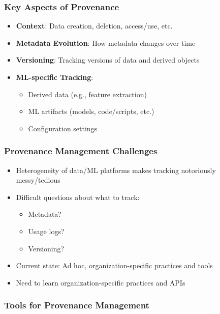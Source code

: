 \documentclass[12pt]{article}
\begin{document}
\subsubsection{Key Aspects of Provenance}
\begin{itemize}
    \item \textbf{Context}: Data creation, deletion, access/use, etc.
    \item \textbf{Metadata Evolution}: How metadata changes over time
    \item \textbf{Versioning}: Tracking versions of data and derived objects
    \item \textbf{ML-specific Tracking}: 
    \begin{itemize}
        \item Derived data (e.g., feature extraction)
        \item ML artifacts (models, code/scripts, etc.)
        \item Configuration settings
    \end{itemize}
\end{itemize}

\subsubsection{Provenance Management Challenges}
\begin{tcolorbox}[colback=red!5!white,colframe=red!75!black,title={Challenges}]
\begin{itemize}
    \item Heterogeneity of data/ML platforms makes tracking notoriously messy/tedious
    \item Difficult questions about what to track:
    \begin{itemize}
        \item Metadata?
        \item Usage logs?
        \item Versioning?
    \end{itemize}
    \item Current state: Ad hoc, organization-specific practices and tools
    \item Need to learn organization-specific practices and APIs
\end{itemize}
\end{tcolorbox}

\subsubsection{Tools for Provenance Management}
\end{document}
